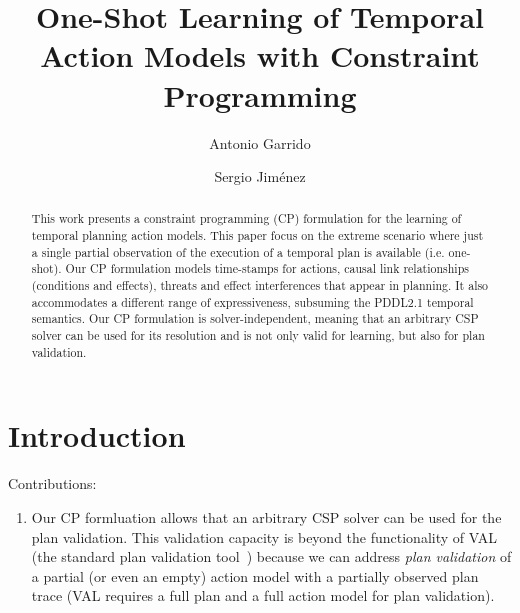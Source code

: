 \documentclass{ecai}
\begin{document}
\title{One-Shot Learning of Temporal Action Models with Constraint Programming}
\author{Antonio Garrido \and Sergio Jim\'enez}
 
\maketitle

\begin{abstract}
  This work presents a constraint programming (CP) formulation for the learning of temporal planning action models. This paper focus on the extreme scenario where just a single partial observation of the execution of a temporal plan is available (i.e. one-shot). Our CP formulation models time-stamps for actions, causal link relationships (conditions and effects), threats and effect interferences that appear in planning. It also accommodates a different range of expressiveness, subsuming the PDDL2.1 temporal semantics. Our CP formulation is solver-independent, meaning that an arbitrary CSP solver can be used for its resolution and is not only valid for learning, but also for plan validation. 
\end{abstract}

\section{Introduction}


Contributions:
\begin{enumerate}
\item Our CP formluation allows that an arbitrary CSP solver can be used for the plan validation.  This validation capacity is beyond the functionality of VAL (the standard plan validation tool~\cite{howey2004val}) because we can address {\em plan validation} of a partial (or even an empty) action model with a partially observed plan trace (VAL requires a full plan and a full action model for plan validation).
\end{enumerate}
  



\end{document}
